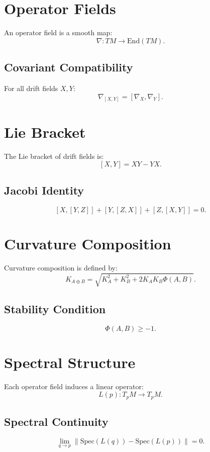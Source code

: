 \documentclass[11pt]{article}
\begin{document}
\section{Operator Fields}

An operator field is a smooth map:
\[
\nabla : TM \to \mathrm{End}(TM).
\]

\subsection{Covariant Compatibility}
For all drift fields $X, Y$:
\[
\nabla_{[X,Y]} = [\nabla_X, \nabla_Y].
\]

\section{Lie Bracket}

The Lie bracket of drift fields is:
\[
[X,Y] = XY - YX.
\]

\subsection{Jacobi Identity}
\[
[X,[Y,Z]] + [Y,[Z,X]] + [Z,[X,Y]] = 0.
\]

\section{Curvature Composition}

Curvature composition is defined by:
\[
K_{A \oplus B}
  = \sqrt{K_A^2 + K_B^2 + 2 K_A K_B \Phi(A,B)}.
\]

\subsection{Stability Condition}
\[
\Phi(A,B) \ge -1.
\]

\section{Spectral Structure}

Each operator field induces a linear operator:
\[
L(p) : T_pM \to T_pM.
\]

\subsection{Spectral Continuity}
\[
\lim_{q \to p}
  \|\mathrm{Spec}(L(q)) - \mathrm{Spec}(L(p))\| = 0.
\]
\end{document}
